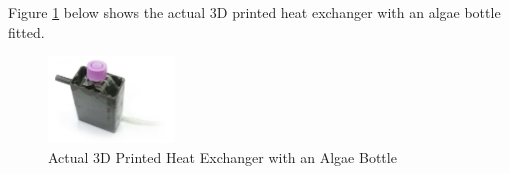 \documentclass[10pt,a4paper]{IEEEtran}
\begin{document}
 	Figure \ref{fig:actual_heatExchanger} below shows the actual 3D printed heat exchanger with an algae bottle fitted.
 		\begin{figure}[H]
 			\begin{center}
 				\includegraphics[width=0.3\textwidth]{image_heatExchanger.jpg}
 				\caption{Actual 3D Printed Heat Exchanger with an Algae Bottle}
 				\label{fig:actual_heatExchanger}
 			\end{center}
 		\end{figure}
	 
\end{document}
